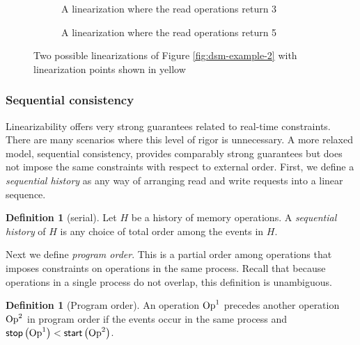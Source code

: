 \documentclass[]             %
{NASA}                       %
\theoremstyle{definition}
\newtheorem{definition}[theorem]{Definition}
\begin{document}
\begin{figure}
  \begin{subfigure}{1\textwidth}
    \setlength\belowcaptionskip{4ex}
    \centering
    
    \caption{A linearization where the read operations return 3}
    \label{fig:dsm-example-2-linearizations-1}
  \end{subfigure}
  \begin{subfigure}{1\textwidth}
    
        \caption{A linearization where the read operations return 5}
    \label{fig:dsm-example-2-linearizations-b}
  \end{subfigure}
  \caption{Two possible linearizations of Figure \ref{fig:dsm-example-2} with linearization points shown in yellow}
  \label{fig:dsm-example-2-linearizations}
\end{figure}

\subsubsection{Sequential consistency}
\label{sequential-consistency}

Linearizability offers very strong guarantees related to real-time
constraints. There are many scenarios where this level of rigor is
unnecessary. A more relaxed model, sequential consistency, provides
comparably strong guarantees but does not impose the same constraints
with respect to external order. First, we define a \emph{sequential
  history} as any way of arranging read and write requests into a
linear sequence.

\begin{definition}[serial]
  \label{def:sequential-history}
  Let $H$ be a history of memory operations. A \emph{sequential
    history} of $H$ is any choice of total order among the events in
  $H$.
\end{definition}

Next we define \emph{program order}. This is a partial order among
operations that imposes constraints on operations in the same
process. Recall that because operations in a single process do not
overlap, this definition is unambiguous.

\begin{definition}[Program order]
  An operation $\mathrm{Op}^1$ precedes another operation $\mathrm{Op}^2$ in program
  order if the events occur in the same process and
  $\mathsf{stop}\left(\mathrm{Op}^1\right) < \mathsf{start}\left(\mathrm{Op}^2\right)$.
\end{definition}
\end{document}
